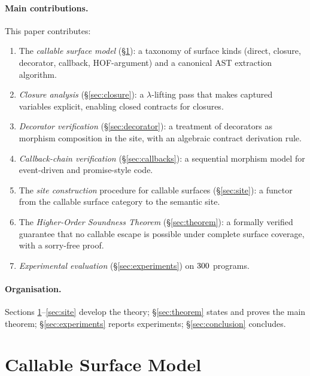 \documentclass[11pt]{article}
\begin{document}
\paragraph{Main contributions.}
This paper contributes:
\begin{enumerate}
  \item The \emph{callable surface model} (\S\ref{sec:model}):
        a taxonomy of surface kinds (direct, closure, decorator,
        callback, HOF-argument) and a canonical AST extraction
        algorithm.
  \item \emph{Closure analysis} (\S\ref{sec:closure}):
        a $\lambda$-lifting pass that makes captured variables
        explicit, enabling closed contracts for closures.
  \item \emph{Decorator verification} (\S\ref{sec:decorator}):
        a treatment of decorators as morphism composition in the site,
        with an algebraic contract derivation rule.
  \item \emph{Callback-chain verification} (\S\ref{sec:callbacks}):
        a sequential morphism model for event-driven and promise-style
        code.
  \item The \emph{site construction} procedure for callable surfaces
        (\S\ref{sec:site}): a functor from the callable surface
        category to the semantic site.
  \item The \emph{Higher-Order Soundness Theorem}
        (\S\ref{sec:theorem}): a formally verified guarantee that no
        callable escape is possible under complete surface coverage,
        with a sorry-free \LEAN{} proof.
  \item \emph{Experimental evaluation} (\S\ref{sec:experiments}) on
        $300{}$ programs.
\end{enumerate}

\paragraph{Organisation.}
Sections \ref{sec:model}--\ref{sec:site} develop the theory;
\S\ref{sec:theorem} states and proves the main theorem;
\S\ref{sec:experiments} reports experiments; \S\ref{sec:conclusion}
concludes.

\section{Callable Surface Model}\label{sec:model}
\end{document}

